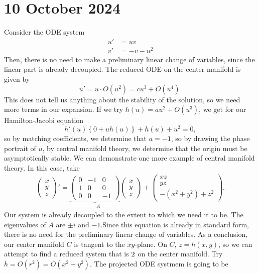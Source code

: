 \documentclass{article}
\begin{document}
    \section*{10 October 2024}
        Consider the ODE system
        \begin{align*}
            u' &= uv \\
            v' &= -v - u^2
        \end{align*}
        Then, there is no need to make a preliminary linear change of variables, since the linear part is already decoupled. The reduced ODE on the center manifold is given by 
        \[
            u' = u \cdot O(u^2) = cu^3 + O(u^4).
        \]
        This does not tell us anything about the stability of the solution, so we need more terms in our expansion. If we try $h(u) = au^2 + O(u^3)$, we get for our Hamilton-Jacobi equation
        \[
            h'(u) \left\{0 + uh(u) \right\} + h(u) + u^2 = 0,
        \]  
        so by matching coefficients, we determine that $a = -1$, so by drawing the phase portrait of $u$, by central manifold theory, we determine that the origin must be asymptotically stable. We can demonstrate one more example of central manifold theory. In this case, take 
        \begin{align*}
            \begin{pmatrix}
                x \\ y \\ z
            \end{pmatrix}' = 
            \underbrace{
            \begin{pmatrix}
                0 & -1 & 0 \\
                1 & 0 & 0 \\
                0 & 0 & -1
            \end{pmatrix}}_{= A}
            \begin{pmatrix}
                x \\ y \\ z 
            \end{pmatrix} + 
            \begin{pmatrix}
                xz \\ yz \\ -(x^2 + y^2) + z^2
            \end{pmatrix}.
        \end{align*}
        Our system is already decoupled to the extent to which we need it to be. The eigenvalues of $A$ are $\pm i$ and $-1$.Since this equation is already in standard form, there is no need for the preliminary linear change of variables. As a conclusion, our center manifold $C$ is tangent to the $xy$-plane. On $C$, $z =h(x, y)$, so we can attempt to find a reduced system that is $2 \time 2$ on the center manifold. Try $h = O(r^2) = O(x^2 + y^2)$. The projected ODE systmem is going to be 
\end{document}
